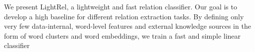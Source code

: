 We present LightRel, a lightweight and fast relation classifier. Our goal is to develop a high baseline for different relation extraction tasks. By defining only very few data-internal, word-level features and external knowledge sources in the form of word clusters and word embeddings, we train a fast and simple linear classifier
